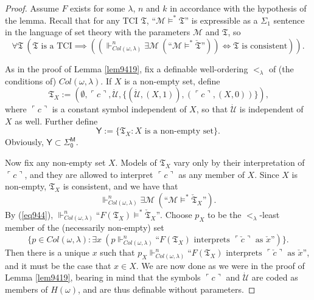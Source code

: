 \documentclass[12pt, twoside]{memoir}
\numberwithin{equation}{section}
\theoremstyle{definition}
\theoremstyle{remark}
\theoremstyle{definition}
\theoremstyle{definition}
\theoremstyle{definition}
\theoremstyle{remark}
\begin{document}
\begin{proof}
Assume $F$ exists for some $\lambda$, $n$ and $k$ in accordance with the hypothesis of the lemma. Recall that for any TCI $\mathfrak{T}$, $\text{``} \mathcal{M} \models^* \mathfrak{T} \text{''}$ is expressible as a $\Sigma_1$ sentence in the language of set theory with the parameters $\mathcal{M}$ and $\mathfrak{T}$, so 
\begin{equation*}
    \forall \mathfrak{T} \ (\mathfrak{T} \text{ is a TCI} \implies ((\Vdash^n_{Col(\omega, \lambda)} \exists \mathcal{M} \ (\text{``} \mathcal{M} \models^* \check{\mathfrak{T}} \text{''})) \iff \mathfrak{T} \text{ is consistent})) \text{.}
\end{equation*}

As in the proof of Lemma \ref{lem9419}, fix a definable well-ordering $<_{\lambda}$ of (the conditions of) $Col(\omega, \lambda)$. If $X$ is a non-empty set, define
\begin{equation*}
    \mathfrak{T}_X := (\emptyset, \ulcorner c \urcorner, \dot{\mathcal{U}}, \{(\dot{\mathcal{U}}, (X, 1)), (\ulcorner c \urcorner, (X, 0))\}) \text{,}
\end{equation*}
where $\ulcorner c \urcorner$ is a constant symbol independent of $X$, so that $\dot{\mathcal{U}}$ is independent of $X$ as well. Further define 
\begin{equation*}
    \mathsf{Y} := \{\mathfrak{T}_X : X \text{ is a non-empty set}\} \text{.}
\end{equation*}
Obviously, $\mathsf{Y} \subset \mathsf{\Sigma^M_0}$. 

Now fix any non-empty set $X$. Models of $\mathfrak{T}_X$ vary only by their interpretation of $\ulcorner c \urcorner$, and they are allowed to interpret $\ulcorner c \urcorner$ as any member of $X$. Since $X$ is non-empty, $\mathfrak{T}_X$ is consistent, and we have that 
\begin{equation*}
    \Vdash^n_{Col(\omega, \lambda)} \exists \mathcal{M} \ (\text{``} \mathcal{M} \models^* \check{\mathfrak{T}}_X \text{''}) \text{.}
\end{equation*}
By (\ref{eq944}), $\Vdash^n_{Col(\omega, \lambda)} \text{``} F(\mathfrak{T}_X) \models^* \check{\mathfrak{T}}_X \text{''}$. Choose $p_X$ to be the $<_{\lambda}$-least member of the (necessarily non-empty) set 
\begin{equation*}
    \{p \in Col(\omega, \lambda) : \exists x \ (p \Vdash^n_{Col(\omega, \lambda)} \text{``} F(\mathfrak{T}_X) \text{ interprets } \ulcorner \check{c} \urcorner \text{ as } \check{x} \text{''})\} \text{.}
\end{equation*}
Then there is a unique $x$ such that $p_X \Vdash^n_{Col(\omega, \lambda)} \text{``} F(\mathfrak{T}_X) \text{ interprets } \ulcorner \check{c} \urcorner \text{ as } \check{x} \text{''}$, and it must be the case that $x \in X$. We are now done as we were in the proof of Lemma \ref{lem9419}, bearing in mind that the symbols $\ulcorner c \urcorner$ and $\dot{\mathcal{U}}$ are coded as members of $H(\omega)$, and are thus definable without parameters.
\end{proof}
\end{document}

